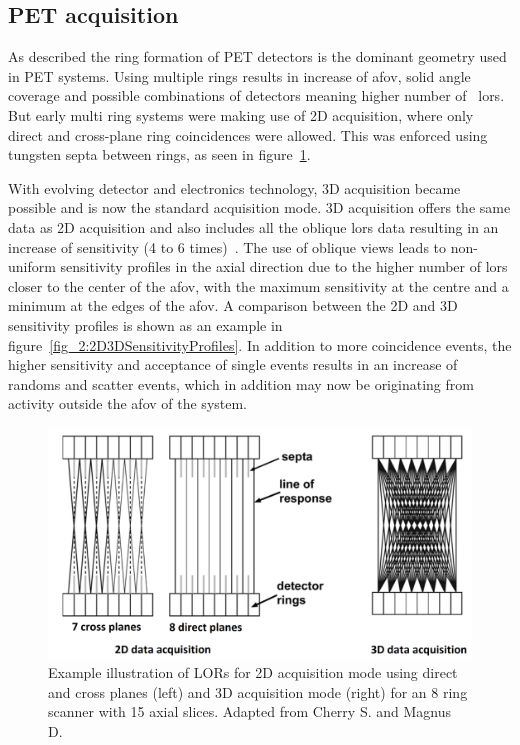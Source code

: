 \subsection{PET acquisition}
As described the ring formation of PET detectors is the dominant geometry used in PET systems. Using multiple rings results in increase of \gls{afov}, solid angle coverage and possible combinations of detectors meaning higher number of ~\glspl{lor}. But early multi ring systems were making use of 2D acquisition, where only direct and cross-plane ring coincidences were allowed. This was enforced using tungsten septa between rings, as seen in figure~\ref{fig_2:2D3D}. %

With evolving detector and electronics technology, 3D acquisition became possible and is now the standard acquisition mode. 3D acquisition offers the same data as 2D acquisition and also includes all the oblique \glspl{lor} data resulting in an increase of sensitivity (4 to 6 times)~\cite{Fahey2002}. The use of oblique views leads to non-uniform sensitivity profiles in the axial direction due to the higher number of \glspl{lor} closer to the center of the \gls{afov}, with the maximum sensitivity at the centre and a minimum at the edges of the \gls{afov}. A comparison between the 2D and 3D sensitivity profiles is shown as an example in figure~\ref{fig_2:2D3DSensitivityProfiles}.
In addition to more coincidence events, the higher sensitivity and acceptance of single events results in an increase of randoms and scatter events, which in addition may now be originating from activity outside the \gls{afov} of the system. 
%
\begin{figure} [h!]
\centering
\includegraphics[scale=0.40,angle=0]{2_Theory_Methods/figures/Phelps_2D_3D_Acquisition.pdf}
\caption{Example illustration of LORs for 2D acquisition mode using direct and cross planes (left) and 3D  acquisition mode (right) for an 8 ring scanner with 15 axial slices. Adapted from Cherry S. and Magnus D.~\cite{cherry2004pet}} 
\label{fig_2:2D3D}
\end{figure} 

